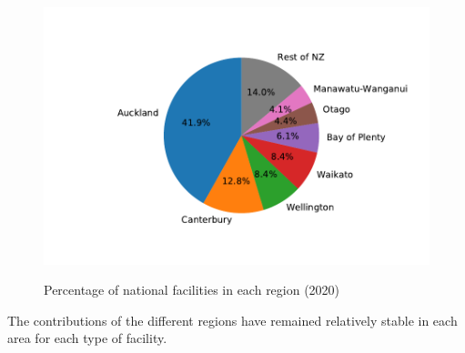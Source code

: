 \documentclass[3p, a4paper, authoryear, 11pt, fleqn, review]{elsarticle}
\begin{document}
\begin{figure}[h!]
{\begin{minipage}[t]{0.30\linewidth}
	\centering
	\includegraphics[width=1\linewidth]{PieSell_2020} \medskip \\
	\end{minipage}}
\caption{Percentage of national facilities in each region (2020)}\label{fig:PercOfFac}
\end{figure}
%

The contributions of the different regions have remained relatively stable in each area for each type of facility. 
\end{document}
